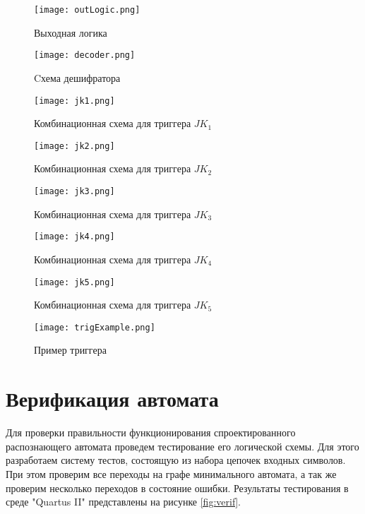 \documentclass[a4paper,14pt,russian]{extarticle} %
\begin{document}
\begin{figure}[H]
	\centering
	\texttt{[image: outLogic.png]}
	\caption{Выходная логика}
	\label{fig:outLogic}
\end{figure}


\begin{figure}[H]
	\centering
	\texttt{[image: decoder.png]}
	\caption{Cхема дешифратора}
	\label{fig:decoder}
\end{figure}

\begin{figure}[H]
	\centering
	\texttt{[image: jk1.png]}
	\caption{Комбинационная схема для триггера  \({JK}_1\)}
	\label{fig:JK1}
\end{figure}

\begin{figure}[H]
	\centering
	\texttt{[image: jk2.png]}
	\caption{Комбинационная схема для триггера  \({JK}_2\)}
	\label{fig:JK2}
\end{figure}

\begin{figure}[H]
	\centering
	\texttt{[image: jk3.png]}
	\caption{Комбинационная схема для триггера  \({JK}_3\)}
	\label{fig:JK3}
\end{figure}

\begin{figure}[H]
	\centering
	\texttt{[image: jk4.png]}
	\caption{Комбинационная схема для триггера  \({JK}_4\)}
	\label{fig:JK4}
\end{figure}

\begin{figure}[H]
	\centering
	\texttt{[image: jk5.png]}
	\caption{Комбинационная схема для триггера  \({JK}_5\)}
	\label{fig:JK5}
\end{figure}

\begin{figure}[H]
	\centering
	\texttt{[image: trigExample.png]}
	\caption{Пример триггера}
	\label{fig:JKtrigger}
\end{figure}

\section {Верификация автомата}

Для проверки правильности функционирования спроектированного распознающего автомата проведем тестирование его логической схемы. Для этого разработаем систему тестов, состоящую из набора цепочек входных символов. При этом проверим все переходы на графе минимального автомата, а так же проверим несколько переходов в состояние ошибки. Результаты тестирования в среде "Quartus II" представлены на рисунке \ref{fig:verif}.
\end{document}
